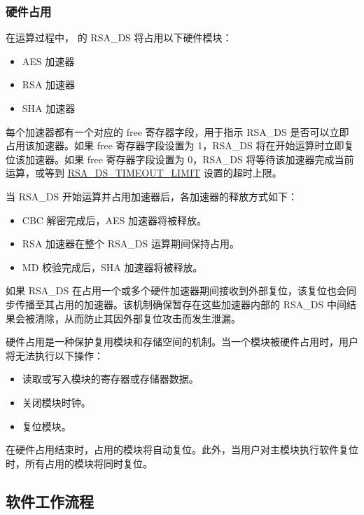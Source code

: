 \documentclass[main\_\_CN.tex]{subfiles}
\begin{document}
\subsubsection{硬件占用}

在运算过程中，\chipname{} 的 RSA\_DS 将占用以下硬件模块：
\begin{itemize}
    \item AES 加速器
    \item RSA 加速器
    \item SHA 加速器
\end{itemize}

每个加速器都有一个对应的 free 寄存器字段，用于指示 RSA\_DS 是否可以立即占用该加速器。如果 free 寄存器字段设置为 1，RSA\_DS 将在开始运算时立即复位该加速器。如果 free 寄存器字段设置为 0，RSA\_DS 将等待该加速器完成当前运算，或等到 \hyperref[fielddesc:RSADSTIMEOUTLIMIT]{RSA\_DS\_TIMEOUT\_LIMIT} 设置的超时上限。

当 RSA\_DS 开始运算并占用加速器后，各加速器的释放方式如下：
\begin{itemize}
    \item CBC 解密完成后，AES 加速器将被释放。
    \item RSA 加速器在整个 RSA\_DS 运算期间保持占用。
    \item MD 校验完成后，SHA 加速器将被释放。
\end{itemize}

如果 RSA\_DS 在占用一个或多个硬件加速器期间接收到外部复位，该复位也会同步传播至其占用的加速器。该机制确保暂存在这些加速器内部的 RSA\_DS 中间结果会被清除，从而防止其因外部复位攻击而发生泄漏。

\begin{tiplisting}
硬件占用是一种保护复用模块和存储空间的机制。当一个模块被硬件占用时，用户将无法执行以下操作：
\vspace{-0.5em}
\begin{itemize}
    \item 读取或写入模块的寄存器或存储器数据。
    \item 关闭模块时钟。
    \item 复位模块。
\end{itemize}
\vspace{-0.5em}
在硬件占用结束时，占用的模块将自动复位。此外，当用户对主模块执行软件复位时，所有占用的模块将同时复位。
\end{tiplisting}

\subsection{软件工作流程}
\end{document}
